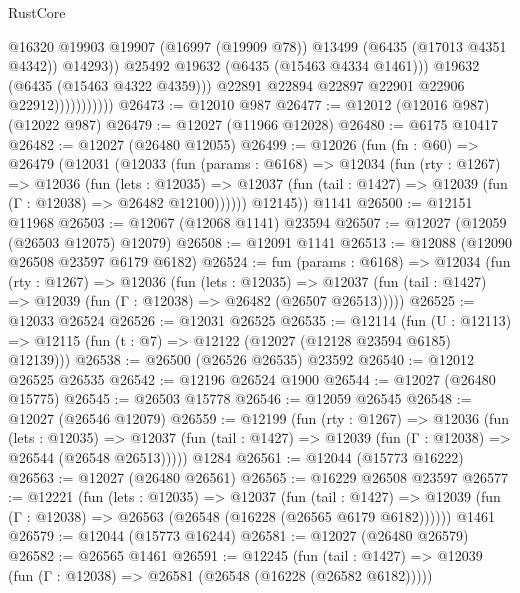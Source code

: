 \begin{lexlean}{RustCore}
\begin{coremodule}
                                  @16320
                                  @19903
                                  @19907
                                  (@16997 (@19909 @78))
                                  @13499
                                  (@6435 (@17013 @4351 @4342))
                                  @14293))
                              @25492
                              @19632
                              (@6435 (@15463 @4334 @1461)))
                            @19632
                            (@6435 (@15463 @4322 @4359)))
                          @22891
                          @22894
                          @22897
                          @22901
                          @22906
                          @22912)))))))))))
@26473 := @12010 @987
@26477 := @12012 (@12016 @987) (@12022 @987)
@26479 := @12027 (@11966 @12028)
@26480 := @6175 @10417
@26482 := @12027 (@26480 @12055)
@26499 := @12026
    (fun (fn : @60) =>
    @26479
      (@12031
        (@12033
          (fun (params : @6168) =>
          @12034
            (fun (rty : @1267) =>
            @12036
              (fun (lets : @12035) =>
              @12037 (fun (tail : @1427) => @12039 (fun (Γ : @12038) => @26482 @12100))))))
        @12145))
    @1141
@26500 := @12151 @11968
@26503 := @12067 (@12068 @1141) @23594
@26507 := @12027 (@12059 (@26503 @12075) @12079)
@26508 := @12091 @1141
@26513 := @12088 (@12090 @26508 @23597 @6179 @6182)
@26524 := fun (params : @6168) =>
  @12034
    (fun (rty : @1267) =>
    @12036
      (fun (lets : @12035) =>
      @12037 (fun (tail : @1427) => @12039 (fun (Γ : @12038) => @26482 (@26507 @26513)))))
@26525 := @12033 @26524
@26526 := @12031 @26525
@26535 := @12114
    (fun (U : @12113) => @12115 (fun (t : @7) => @12122 (@12027 (@12128 @23594 @6185) @12139)))
@26538 := @26500 (@26526 @26535) @23592
@26540 := @12012 @26525 @26535
@26542 := @12196 @26524 @1900
@26544 := @12027 (@26480 @15775)
@26545 := @26503 @15778
@26546 := @12059 @26545
@26548 := @12027 (@26546 @12079)
@26559 := @12199
    (fun (rty : @1267) =>
    @12036
      (fun (lets : @12035) =>
      @12037 (fun (tail : @1427) => @12039 (fun (Γ : @12038) => @26544 (@26548 @26513)))))
    @1284
@26561 := @12044 (@15773 @16222)
@26563 := @12027 (@26480 @26561)
@26565 := @16229 @26508 @23597
@26577 := @12221
    (fun (lets : @12035) =>
    @12037
      (fun (tail : @1427) =>
      @12039 (fun (Γ : @12038) => @26563 (@26548 (@16228 (@26565 @6179 @6182))))))
    @1461
@26579 := @12044 (@15773 @16244)
@26581 := @12027 (@26480 @26579)
@26582 := @26565 @1461
@26591 := @12245
    (fun (tail : @1427) => @12039 (fun (Γ : @12038) => @26581 (@26548 (@16228 (@26582 @6182)))))

\end{coremodule}
\end{lexlean}
